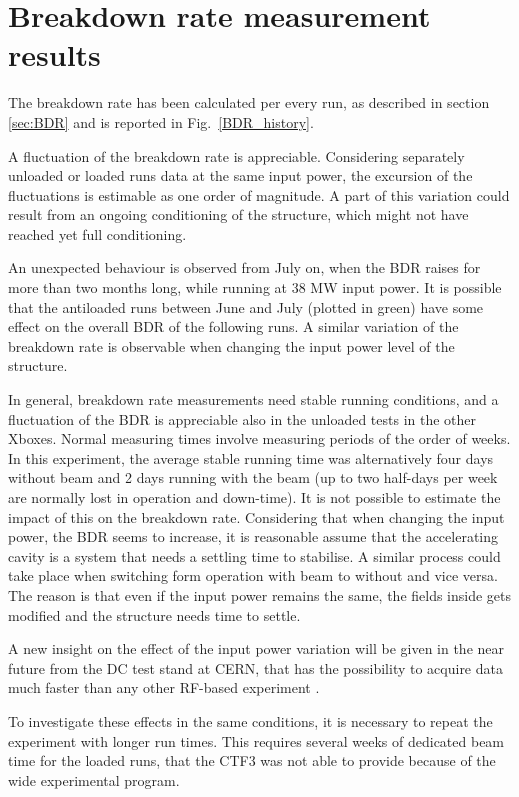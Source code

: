 \section[Breakdown rate measurement results]{Breakdown rate measurement results}

The breakdown rate has been calculated per every run, as described in section \ref{sec:BDR} and is reported in Fig.~\ref{BDR_history}. 

A fluctuation of the breakdown rate is appreciable. Considering separately unloaded or loaded runs data at the same input power, the excursion of the fluctuations is estimable as one order of magnitude. A part of this variation could result from an ongoing conditioning of the structure, which might not have reached yet full conditioning.

An unexpected behaviour is observed from July on, when the BDR raises for more than two months long, while running at 38 MW input power. It is possible that the antiloaded runs between June and July (plotted in green) have some effect on the overall BDR of the following runs. A similar variation of the breakdown rate is observable when changing the input power level of the structure.

In general, breakdown rate measurements need stable running conditions, and a fluctuation of the BDR is appreciable also in the unloaded tests in the other Xboxes. Normal measuring times involve measuring periods of the order of weeks. In this experiment, the average stable running time was alternatively four days without beam and 2 days running with the beam (up to two half-days per week are normally lost in operation and down-time). It is not possible to estimate the impact of this on the breakdown rate. Considering that when changing the input power, the BDR seems to increase, it is reasonable assume that the accelerating cavity is a system that needs a settling time to stabilise. A similar process could take place when switching form operation with beam to without and vice versa. The reason is that even if the input power remains the same, the fields inside gets modified and the structure needs time to settle. 

A new insight on the effect of the input power variation will be given in the near future from the DC test stand at CERN, that has the possibility to acquire data much faster than any other RF-based experiment \cite{Walter:PC}.

To investigate these effects in the same conditions, it is necessary to repeat the experiment with longer run times. This requires several weeks of dedicated beam time for the loaded runs, that the CTF3 was not able to provide because of the wide experimental program.

